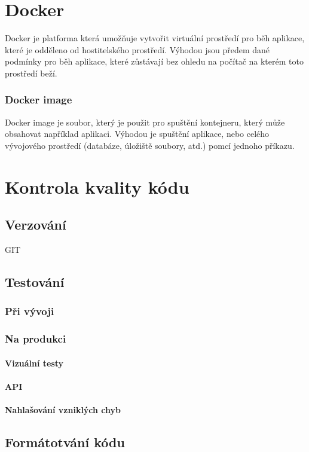 \documentclass[12pt, a4paper,
 twoside,        %
 openright
]{report}
\begin{document}
\chapter{Docker}
Docker je platforma která umožňuje vytvořit virtuální prostředí pro 
běh aplikace, které je odděleno od hostitelského prostředí.
Výhodou jsou předem dané podmínky pro běh aplikace, které zůstávají
bez ohledu na počítač na kterém toto prostředí beží. 
\subsection{Docker image}
Docker image je soubor, který je použit pro spuštění kontejneru, který
může obsahovat například aplikaci. Výhodou je spuštění aplikace,
nebo celého vývojového prostředí (databáze, úložiště soubory, atd.) pomcí
jednoho příkazu.

\chapter{Kontrola kvality kódu}
\section{Verzování}
GIT
\section{Testování}
\subsection{Při vývoji}  

\subsection{Na produkci} 
\subsubsection{Vizuální testy}
\subsubsection{API}
\subsubsection{Nahlašování vzniklých chyb}


 
\section{Formátotvání kódu}  
\end{document}
